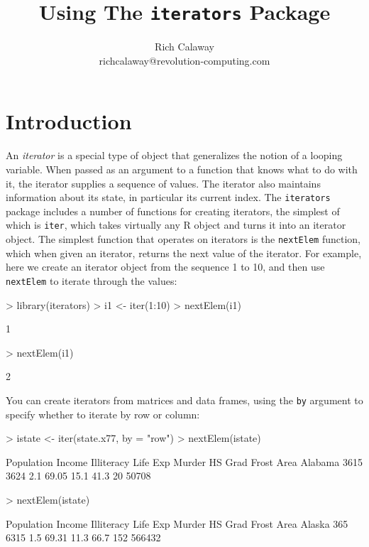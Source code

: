 \documentclass[12pt]{article}
\title{Using The {\tt iterators} Package}
\author{Rich Calaway \\ richcalaway@revolution-computing.com}
\begin{document}
\maketitle

\thispagestyle{empty}
\section{Introduction}

An {\em iterator} is a special type of object that generalizes the notion of 
a looping variable. When passed as an argument to a function that knows what 
to do with it, the iterator supplies a sequence of values. The iterator also 
maintains information about its state, in particular its current index. The
\texttt{iterators} package includes a number of functions for creating 
iterators, the simplest of which is \texttt{iter}, which takes
virtually any R object and turns it into an iterator object. The simplest 
function that operates on iterators is the \texttt{nextElem} function, which 
when given an iterator, returns the next value of the iterator. For example, 
here we create an iterator object from the sequence 1 to 10, and then use 
\texttt{nextElem} to iterate through the values:
\begin{Schunk}
\begin{Sinput}
> library(iterators)
> i1 <- iter(1:10)
> nextElem(i1)
\end{Sinput}
\begin{Soutput}
[1] 1
\end{Soutput}
\begin{Sinput}
> nextElem(i1)
\end{Sinput}
\begin{Soutput}
[1] 2
\end{Soutput}
\end{Schunk}

You can create iterators from matrices and data frames, using the \texttt{by} argument to specify whether to iterate by row or column:
\begin{Schunk}
\begin{Sinput}
> istate <- iter(state.x77, by = "row")
> nextElem(istate)
\end{Sinput}
\begin{Soutput}
        Population Income Illiteracy Life Exp Murder HS Grad Frost  Area
Alabama       3615   3624        2.1    69.05   15.1    41.3    20 50708
\end{Soutput}
\begin{Sinput}
> nextElem(istate)
\end{Sinput}
\begin{Soutput}
       Population Income Illiteracy Life Exp Murder HS Grad Frost   Area
Alaska        365   6315        1.5    69.31   11.3    66.7   152 566432
\end{Soutput}
\end{Schunk}
\end{document}
